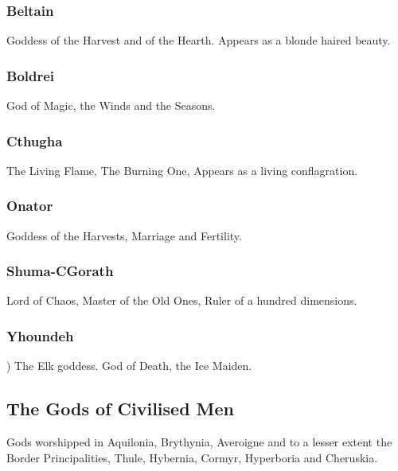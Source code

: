 \documentclass[a4paper]{style/dnd4e}
\begin{document}
\subsubsection*{Beltain}
Goddess of the Harvest and of the Hearth.  Appears as a blonde haired beauty.  


\subsubsection*{Boldrei}
God of Magic, the Winds and the Seasons.    

  
\subsubsection*{Cthugha}
The Living Flame, The Burning One, Appears as a living conflagration.  


\subsubsection*{Onator}
Goddess of the Harvests, Marriage and Fertility.    
  

\subsubsection*{Shuma-CGorath}
\colours{}
Lord of Chaos, Master of the Old Ones, Ruler of a hundred dimensions. 


\subsubsection*{Yhoundeh}
)
The Elk goddess.  God of Death, the Ice Maiden.  



\subsection*{The Gods of Civilised Men}
Gods worshipped in Aquilonia, Brythynia, Averoigne and to a lesser 
extent the Border Principalities, Thule, Hybernia, Cormyr, Hyperboria and 
Cheruskia.
\end{document}
